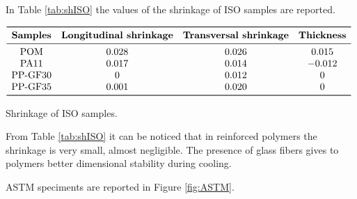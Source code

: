 \documentclass[a4paper, 11pt]{article}
\begin{document}
In Table \ref{tab:shISO} the values of the shrinkage of ISO samples are reported.

\begin{table}[htp]
\centering
$
\begin{array}{cccc}
\toprule
\textbf{Samples} & \textbf{Longitudinal shrinkage} & \textbf{Transversal shrinkage} & \textbf{Thickness} \\
\midrule
\text{POM} & 0.028 & 0.026 & 0.015 \\
\text{PA11} & 0.017 & 0.014 & -0.012 \\
\text{PP-GF30} & 0 & 0.012 & 0  \\
\text{PP-GF35} & 0.001 & 0.020 & 0  \\
\bottomrule
\end{array}
$
\caption{Shrinkage of ISO samples.}
\label{tab:shISO}
\end{table}

From Table \ref{tab:shISO} it can be noticed that in reinforced polymers the shrinkage is very small, almost negligible. The presence of glass fibers gives to polymers better dimensional stability during cooling. 

ASTM speciments are reported in Figure \ref{fig:ASTM}.
\end{document}
